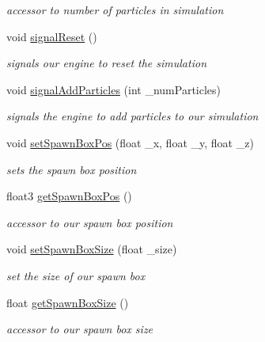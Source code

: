 \begin{DoxyCompactItemize}
\begin{DoxyCompactList}\small\item\em accessor to number of particles in simulation \end{DoxyCompactList}\item 
\hypertarget{class_s_p_h_engine_a692ed8ae0cdb67f4a774fa2a94ad635f}{void \hyperlink{class_s_p_h_engine_a692ed8ae0cdb67f4a774fa2a94ad635f}{signal\-Reset} ()}\label{class_s_p_h_engine_a692ed8ae0cdb67f4a774fa2a94ad635f}

\begin{DoxyCompactList}\small\item\em signals our engine to reset the simulation \end{DoxyCompactList}\item 
void \hyperlink{class_s_p_h_engine_a4e61b1f56e20ab4eee7edd111c59912f}{signal\-Add\-Particles} (int \-\_\-num\-Particles)
\begin{DoxyCompactList}\small\item\em signals the engine to add particles to our simulation \end{DoxyCompactList}\item 
void \hyperlink{class_s_p_h_engine_a130606677b2c3edbc9b95006672c1578}{set\-Spawn\-Box\-Pos} (float \-\_\-x, float \-\_\-y, float \-\_\-z)
\begin{DoxyCompactList}\small\item\em sets the spawn box position \end{DoxyCompactList}\item 
float3 \hyperlink{class_s_p_h_engine_a452295b33bfa893db3c9484da9ce9fb5}{get\-Spawn\-Box\-Pos} ()
\begin{DoxyCompactList}\small\item\em accessor to our spawn box position \end{DoxyCompactList}\item 
void \hyperlink{class_s_p_h_engine_a2bf5d2bc9fc8bcc39d42108150123663}{set\-Spawn\-Box\-Size} (float \-\_\-size)
\begin{DoxyCompactList}\small\item\em set the size of our spawn box \end{DoxyCompactList}\item 
float \hyperlink{class_s_p_h_engine_a234554f5b25de8cc34541e1fd0a4b52b}{get\-Spawn\-Box\-Size} ()
\begin{DoxyCompactList}\small\item\em accessor to our spawn box size \end{DoxyCompactList}\end{DoxyCompactItemize}



